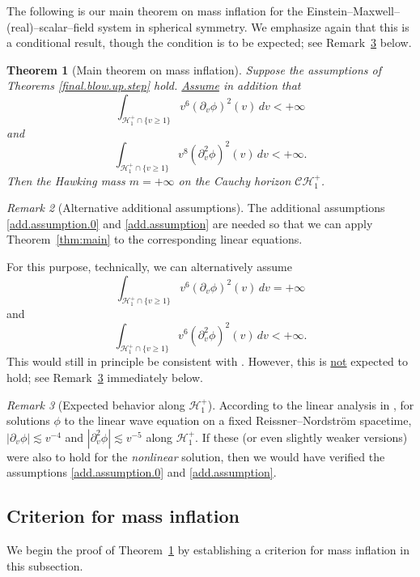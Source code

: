 \documentclass[10pt, reqno]{amsart}
\newtheorem{theorem}{Theorem}[section]
\theoremstyle{definition}
\theoremstyle{remark}
\newtheorem{remark}[theorem]{Remark}
\numberwithin{equation}{section}
\def\ls{\lesssim}
\newcommand{\rd}{\partial}
\newcommand{\0}{\emptyset}
\newcommand{\calC}{\mathcal C}
\newcommand{\calH}{\mathcal H}
\newcommand{\CH}{\calC \calH^{+}}		%
\newcommand{\EH}{\calH^{+}}
\begin{document}
The following is our main theorem on mass inflation for the Einstein--Maxwell--(real)--scalar--field system in spherical symmetry. We emphasize again that this is a conditional result, though the condition is to be expected; see Remark~\ref{rmk:expectation} below.
\begin{theorem}[Main theorem on mass inflation]\label{mass.infl.thm}
Suppose the assumptions of Theorems \ref{final.blow.up.step} hold. \underline{Assume} in addition that 
\begin{equation}\label{add.assumption.0}
\int_{\mathcal H^+_1\cap\{v\geq 1\}} v^{6} (\rd_v\phi)^2(v)\, dv < +\infty
\end{equation}
and
\begin{equation}\label{add.assumption}
\int_{\mathcal H^+_1\cap\{v\geq 1\}} v^{8}(\rd_v^2\phi)^2(v)\, dv < +\infty. 
\end{equation}
Then the Hawking mass $m=+\infty$ on the Cauchy horizon $\CH_1$.
\end{theorem}

\begin{remark}[Alternative additional assumptions] 
The additional assumptions \eqref{add.assumption.0} and \eqref{add.assumption} are needed so that we can apply 
Theorem~\ref{thm:main} to the corresponding linear equations.

For this purpose, technically, we can alternatively assume
$$\int_{\mathcal H^+_1\cap\{v\geq 1\}} v^{6} (\rd_v\phi)^2(v)\, dv = +\infty$$
and
$$\int_{\mathcal H^+_1\cap\{v\geq 1\}} v^{6}(\rd_v^2\phi)^2(v)\, dv < +\infty.$$ 
This would still in principle be consistent with \cite{LO.interior, LO.exterior}. However, this is \underline{not} expected to hold; see Remark~\ref{rmk:expectation} immediately below.
\end{remark}


\begin{remark}[Expected behavior along $\EH_1$]\label{rmk:expectation}
According to the linear analysis in \cite{AAG,HintzPriceLaw}, for solutions $\phi$ to the linear wave equation on a fixed Reissner--Nordstr\"om spacetime, $|\rd_v\phi|\ls v^{-4}$ and $|\rd_v^2\phi| \ls v^{-5}$ along $\EH_1$. If these (or even slightly weaker versions) were also to hold for the \emph{nonlinear} solution, then we would have verified the assumptions \eqref{add.assumption.0} and \eqref{add.assumption}. 
\end{remark}

\subsection{Criterion for mass inflation}\label{sec:MI.crit} We begin the proof of Theorem~\ref{mass.infl.thm} by establishing a criterion for mass inflation in this subsection.
\end{document}

